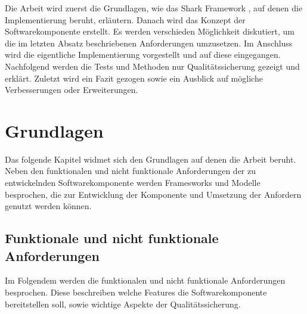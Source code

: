 \documentclass[a4paper]{article}
\begin{document}
	Die Arbeit wird zuerst die Grundlagen, wie das Shark Framework \cite{SharkFW},
	auf denen die Implementierung beruht, erläutern. Danach wird das Konzept
	der Softwarekomponente erstellt. Es werden verschieden Möglichkeit
	diskutiert, um die im letzten Absatz beschriebenen Anforderungen umzusetzen.
	Im Anschluss wird die eigentliche Implementierung vorgestellt und auf
	diese eingegangen. Nachfolgend werden die Tests und Methoden nur
	Qualitätssicherung gezeigt und erklärt. Zuletzt wird ein Fazit gezogen
	sowie ein Ausblick auf mögliche Verbesserungen oder Erweiterungen.

	\newpage
	
	\section{Grundlagen}
	
	Das folgende Kapitel widmet sich den Grundlagen auf denen die Arbeit
	beruht. Neben den funktionalen und nicht funktionale Anforderungen
	der zu entwickelnden Softwarekomponente werden Framesworks und Modelle
	besprochen, die zur Entwicklung der Komponente und Umsetzung der Anfordern
	genutzt werden können. 
	
	\subsection{Funktionale und nicht funktionale Anforderungen}
	\label{sec:requirements}
	
	Im Folgendem werden die funktionalen und nicht funktionale
	Anforderungen besprochen. Diese	beschreiben welche Features die
	Softwarekomponente bereitstellen soll, sowie wichtige Aspekte der
	Qualitätssicherung.
	
\end{document}
